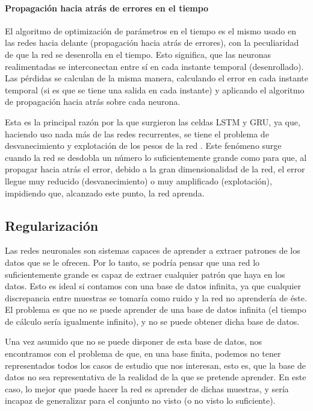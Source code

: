 \paragraph{Propagación hacia atrás de errores en el tiempo}
El algoritmo de optimización de parámetros en el tiempo es el mismo usado en las redes hacia delante (propagación hacia atrás de errores), con la peculiaridad de que la red se desenrolla en el tiempo. Esto significa, que las neuronas realimentadas se interconectan entre sí en cada instante temporal (desenrollado). Las pérdidas se calculan de la misma manera, calculando el error en cada instante temporal (si es que se tiene una salida en cada instante) y aplicando el algoritmo de propagación hacia atrás sobre cada neurona.

Esta es la principal razón por la que surgieron las celdas LSTM y GRU, ya que, haciendo uso nada más de las redes recurrentes, se tiene el problema de desvanecimiento y explotación de los pesos de la red \cite{bengio1994learning}. Este fenómeno surge cuando la red se desdobla un número lo suficientemente grande como para que, al propagar hacia atrás el error, debido a la gran dimensionalidad de la red, el error llegue muy reducido (desvanecimiento) o muy amplificado (explotación), impidiendo que, alcanzado este punto, la red aprenda.

\subsection{Regularización}
Las redes neuronales son sistemas capaces de aprender a extraer patrones de los datos que se le ofrecen. Por lo tanto, se podría pensar que una red lo suficientemente grande es capaz de extraer cualquier patrón que haya en los datos. Esto es ideal si contamos con una base de datos infinita, ya que cualquier discrepancia entre muestras se tomaría como ruido y la red no aprendería de éste. El problema es que no se puede aprender de una base de datos infinita (el tiempo de cálculo sería igualmente infinito), y no se puede obtener dicha base de datos.

Una vez asumido que no se puede disponer de esta base de datos, nos encontramos con el problema de que, en una base finita, podemos no tener representados todos los casos de estudio que nos interesan, esto es, que la base de datos no sea representativa de la realidad de la que se pretende aprender. En este caso, lo mejor que puede hacer la red es aprender de dichas muestras, y sería incapaz de generalizar para el conjunto no visto (o no visto lo suficiente).

